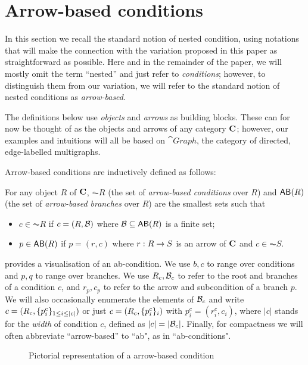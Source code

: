 \section{Arrow-based conditions}

In this section we recall the standard notion of nested condition, using notations that will make the connection with the variation proposed in this paper as straightforward as possible. Here and in the remainder of the paper, we will mostly omit the term ``nested'' and just refer to \emph{conditions}; however, to distinguish them from our variation, we will refer to the standard notion of nested conditions as \emph{arrow-based}.

The definitions below use \emph{objects} and \emph{arrows} as building blocks. These can for now be thought of as the objects and arrows of any category $\mathbf{C}$; however, our examples and intuitions will all be based on $\cat{Graph}$, the category of directed, edge-labelled multigraphs. 

Arrow-based conditions are inductively defined as follows:

\begin{definition}
  For any object $R$ of $\mathbf{C}$, $\AC R$ (the set of \emph{arrow-based conditions} over $R$) and $\AB R$ (the set of \emph{arrow-based branches} over $R$) are the smallest sets such that
  \begin{itemize}
  \item $c\in \AC R$ if $c=(R,\mathcal{B})$ where $\cB\subseteq \AB R$ is a finite set;
  \item $p\in \AB R$ if $p=(r,c)$ where $r: R\rightarrow S$ is an arrow of $\mathbf{C}$ and $c\in \AC S$.
  \end{itemize}
\end{definition}

\medskip\noindent
 provides a visualisation of an ab-condition. We use $b,c$ to range over conditions and $p,q$ to range over branches. We use $R_c,\mathcal{B}_c$ to refer to the root and branches of a condition $c$, and $r_p,c_p$ to refer to the arrow and subcondition of a branch $p$. We will also occasionally enumerate the elements of $\mathcal{B}_c$ and write $c=(R_c, \{{p^c_i}\}_{1\leq i\leq |c|})$ or just $c=(R_c, \{{p^c_i}\}_i)$ with $p^c_i=(r^c_i,c_i)$, where $|c|$ stands for the \emph{width} of condition $c$, defined as $|c|=|\mathcal{B}_c|$. Finally, for compactness we will often abbreviate ``arrow-based'' to ``ab", as in ``ab-conditions".
%
\begin{figure}
  \centering
  
  \caption{Pictorial representation of a arrow-based condition}
\end{figure}

